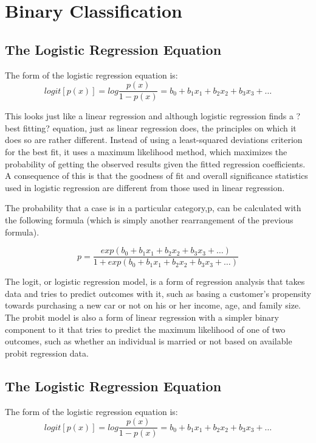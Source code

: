 \documentclass[a4paper,12pt]{article}
\begin{document}
	
\section{Binary Classification}	


\subsection{The Logistic Regression Equation}
The form of the logistic regression equation is:
\[ logit[p(x)] =  log \frac{p(x)}{1-p(x)}  = b_0 + b_1x_1 + b_2x_2 + b_3x_3 + \ldots \]

This looks just like a linear regression and although logistic regression finds a ?best
fitting? equation, just as linear regression does, the principles on which it does so are
rather different. Instead of using a least-squared deviations criterion for the best fit, it
uses a maximum likelihood method, which maximizes the probability of getting the
observed results given the fitted regression coefficients. A consequence of this is that the
goodness of fit and overall significance statistics used in logistic regression are different
from those used in linear regression.

The probability that a case is in a particular category,p, can be calculated with the following formula (which is simply another rearrangement of the previous formula).

\[p = \frac{exp(b_0 + b_1x_1 + b_2x_2 + b_3x_3 + \ldots)}{1 + exp(b_0 + b_1x_1 + b_2x_2 + b_3x_3 + \ldots)}\]


The logit, or logistic regression model, is a form of regression analysis that takes data and tries to predict outcomes with it, such as basing a customer's propensity towards purchasing a new car or not on his or her income, age, and family size. The probit model is also a form of linear regression with a simpler binary component to it that tries to predict the maximum likelihood of one of two outcomes, such as whether an individual is married or not based on available probit regression data.

\newpage\subsection{The Logistic Regression Equation}
The form of the logistic regression equation is:
\[ logit[p(x)] =  log \frac{p(x)}{1-p(x)}  = b_0 + b_1x_1 + b_2x_2 + b_3x_3 + \ldots \]
\end{document}
